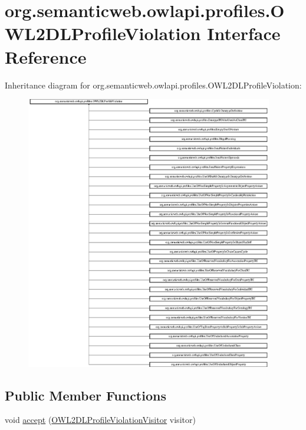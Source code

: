 \hypertarget{interfaceorg_1_1semanticweb_1_1owlapi_1_1profiles_1_1_o_w_l2_d_l_profile_violation}{\section{org.\-semanticweb.\-owlapi.\-profiles.\-O\-W\-L2\-D\-L\-Profile\-Violation Interface Reference}
\label{interfaceorg_1_1semanticweb_1_1owlapi_1_1profiles_1_1_o_w_l2_d_l_profile_violation}
}
Inheritance diagram for org.\-semanticweb.\-owlapi.\-profiles.\-O\-W\-L2\-D\-L\-Profile\-Violation\-:\begin{figure}[H]
\begin{center}
\leavevmode
\includegraphics[height=12.000000cm]{interfaceorg_1_1semanticweb_1_1owlapi_1_1profiles_1_1_o_w_l2_d_l_profile_violation}
\end{center}
\end{figure}
\subsection*{Public Member Functions}
\begin{DoxyCompactItemize}
\item 
void \hyperlink{interfaceorg_1_1semanticweb_1_1owlapi_1_1profiles_1_1_o_w_l2_d_l_profile_violation_a392a99873bed3ad57e7275898cbc6809}{accept} (\hyperlink{interfaceorg_1_1semanticweb_1_1owlapi_1_1profiles_1_1_o_w_l2_d_l_profile_violation_visitor}{O\-W\-L2\-D\-L\-Profile\-Violation\-Visitor} visitor)
\end{DoxyCompactItemize}


